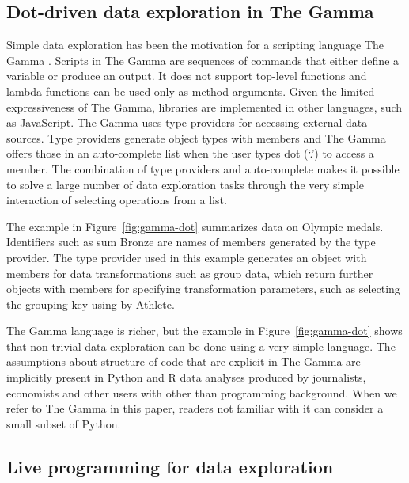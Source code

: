 \documentclass[english,crc]{programming}
\theoremstyle{plain}
\theoremstyle{definition}
\newcommand{\qident}[1]{\textnormal{\sffamily \textquotesingle #1\textquotesingle}}
\begin{document}

\subsection{Dot-driven data exploration in The Gamma}
\label{sec:background-gamma}

Simple data exploration has been the motivation for
a scripting language The Gamma \cite{gamma}. Scripts in The Gamma are sequences of commands
that either define a variable or produce an output. It does not support top-level
functions and lambda functions can be used only as method arguments.
Given the limited expressiveness of The Gamma, libraries are implemented in other languages,
such as JavaScript. The Gamma uses type providers \cite{providers-fsharp}
for accessing external data sources.
Type providers generate object types with members and The Gamma offers those in an
auto-complete list when the user types dot (`.') to access a member.
The combination of type providers and auto-complete makes it
possible to solve a large number of data exploration tasks through the very simple interaction of
selecting operations from a list.

The example in Figure~\ref{fig:gamma-dot} summarizes data on Olympic medals. Identifiers such
as \qident{sum Bronze} are names of members generated by the type provider. The type provider
used in this example generates an object with members for data transformations such as
\qident{group data}, which return further objects with members for specifying transformation
parameters, such as selecting the grouping key using \qident{by Athlete}.

The Gamma language is richer, but the example in Figure~\ref{fig:gamma-dot} shows that non-trivial
data exploration can be done using a very simple language. The assumptions about structure of
code that are explicit in The Gamma are implicitly present in Python and R data analyses
produced by journalists, economists and other users with other than programming background.
When we refer to The Gamma in this paper, readers not familiar with it can consider a small
subset of Python.


\subsection{Live programming for data exploration}
\end{document}

